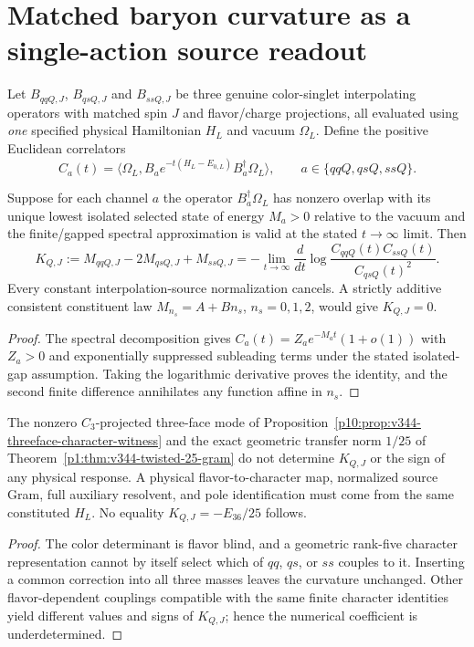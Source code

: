 \documentclass[12pt,a4paper]{article}
\begin{document}
\printbibliography

\section{Matched baryon curvature as a single-action source readout}
\label{p11:sec:v344-curvature-correlator}
Let $B_{qqQ,J}$, $B_{qsQ,J}$ and $B_{ssQ,J}$ be three genuine
color-singlet interpolating operators with matched spin $J$ and
flavor/charge projections, all evaluated using \emph{one} specified
physical Hamiltonian $H_L$ and vacuum $\Omega_L$.  Define the
positive Euclidean correlators
\[
 C_a(t)=\langle\Omega_L,B_a e^{-t(H_L-E_{0,L})}
                 B_a^\dagger\Omega_L\rangle,
 \qquad a\in\{qqQ,qsQ,ssQ\}.
\]

\begin{proposition}
\label{p11:prop:v344-same-action-curvature-extraction}
Suppose for each channel $a$ the operator $B_a^\dagger\Omega_L$
has nonzero overlap with its unique lowest isolated selected state
of energy $M_a>0$ relative to the vacuum and the finite/gapped
spectral approximation is valid at the stated $t\to\infty$ limit.
Then
\[
 \boxed{K_{Q,J}:=M_{qqQ,J}-2M_{qsQ,J}+M_{ssQ,J}
   =-\lim_{t\to\infty}\frac{d}{dt}
      \log\frac{C_{qqQ}(t)C_{ssQ}(t)}{C_{qsQ}(t)^2}.}
\]
Every constant interpolation-source normalization cancels.
A strictly additive consistent constituent law
$M_{n_s}=A+Bn_s$, $n_s=0,1,2$, would give $K_{Q,J}=0$.
\end{proposition}
\begin{proof}
The spectral decomposition gives
$C_a(t)=Z_ae^{-M_at}(1+o(1))$ with $Z_a>0$ and exponentially
suppressed subleading terms under the stated isolated-gap
assumption.  Taking the logarithmic derivative proves the
identity, and the second finite difference annihilates any
function affine in $n_s$.
\end{proof}

\begin{corollary}
\label{p11:cor:v344-character-no-hadron-mass}
The nonzero $C_3$-projected three-face mode of
Proposition~\ref{p10:prop:v344-threeface-character-witness} and
the exact geometric transfer norm $1/25$ of
Theorem~\ref{p1:thm:v344-twisted-25-gram} do not determine
$K_{Q,J}$ or the sign of any physical response.  A physical
flavor-to-character map, normalized source Gram, full auxiliary
resolvent, and pole identification must come from the same
constituted $H_L$.  No equality $K_{Q,J}=-E_{36}/25$ follows.
\end{corollary}
\begin{proof}
The color determinant is flavor blind, and a geometric rank-five
character representation cannot by itself select which of
$qq$, $qs$, or $ss$ couples to it.  Inserting a common correction
into all three masses leaves the curvature unchanged.  Other
flavor-dependent couplings compatible with the same finite
character identities yield different values and signs of
$K_{Q,J}$; hence the numerical coefficient is underdetermined.
\end{proof}
\end{document}
